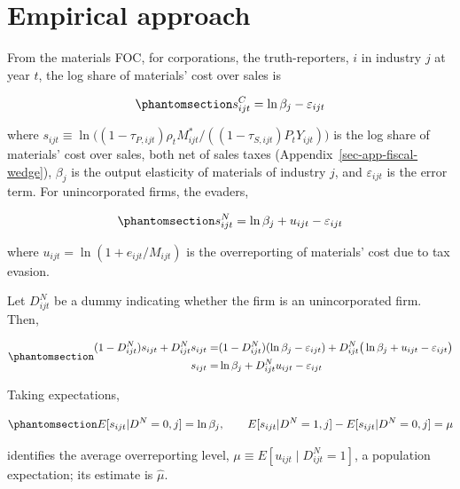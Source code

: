 \documentclass[
  12pt,
  letterpaper,
  oneside,
  openany]{report}
\begin{document}
\section{Empirical approach}\label{sec-fiscal-approach}

From the materials FOC, for corporations, the truth-reporters, \(i\) in
industry \(j\) at year \(t\), the log share of materials' cost over
sales is

\begin{equation}\protect\phantomsection\label{eq-fiscal-corp}{
s_{ijt}^{C} = \ln\beta_j-\varepsilon_{ijt}
}\end{equation}

where
\(s_{ijt}\equiv\ln\big((1-\tau_{P,ijt})\rho_tM^*_{ijt}/((1-\tau_{S,ijt})P_tY_{ijt})\big)\)
is the log share of materials' cost over sales, both net of sales taxes
(Appendix~\ref{sec-app-fiscal-wedge}), \(\beta_j\) is the output
elasticity of materials of industry \(j\), and \(\varepsilon_{ijt}\) is
the error term. For unincorporated firms, the evaders,

\begin{equation}\protect\phantomsection\label{eq-fiscal-unincorp}{
s_{ijt}^{N} = \ln\beta_j + u_{ijt} - \varepsilon_{ijt}
}\end{equation}

where \(u_{ijt}=\ln(1+e_{ijt}/M_{ijt})\) is the overreporting of
materials' cost due to tax evasion.

Let \(D_{ijt}^N\) be a dummy indicating whether the firm is an
unincorporated firm. Then,

\begin{equation}\protect\phantomsection\label{eq-fiscal-stack}{
\begin{aligned}
  (1-D_{ijt}^N)s_{ijt} + D_{ijt}^N s_{ijt} =& (1-D_{ijt}^N)(\ln\beta_j-\varepsilon_{ijt}) + D_{ijt}^N \big(\ln\beta_j+u_{ijt}  - \varepsilon_{ijt}\big) \\
    s_{ijt} =& \ln\beta_j + D_{ijt}^N  u_{ijt} - \varepsilon_{ijt}
\end{aligned}
}\end{equation}

Taking expectations,

\begin{equation}\protect\phantomsection\label{eq-fiscal-mean}{
E[s_{ijt}|D^{N}=0,j]=\ln\beta_j, \qquad E[s_{ijt}|D^{N}=1,j]-E[s_{ijt}|D^{N}=0,j]= \mu
}\end{equation}

identifies the average overreporting level,
\(\mu\equiv E[u_{ijt}\mid D^N_{ijt}=1]\), a population expectation; its
estimate is \(\hat\mu\).
\end{document}
